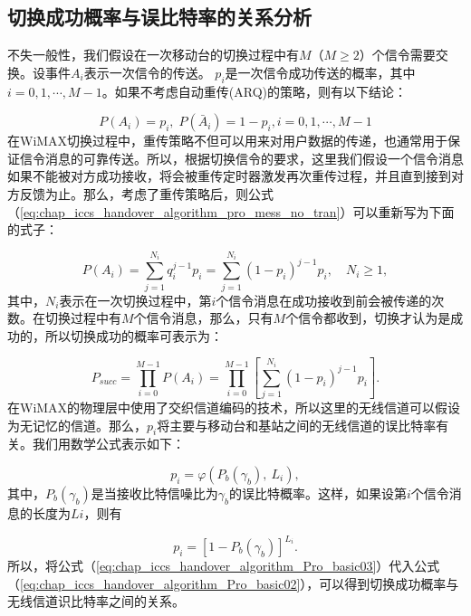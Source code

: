 \subsection{切换成功概率与误比特率的关系分析}
不失一般性，我们假设在一次移动台的切换过程中有$M$（$M \ge 2 $）个信令需要交换。设事件$A_i$表示一次信令的传送。 $p_i$是一次信令成功传送的概率，其中 $i = 0,1, \cdots, M-1 $。如果不考虑自动重传(ARQ)的策略，则有以下结论：

\begin{equation}
\label{eq:chap_iccs_handover_algorithm_pro_mess_no_tran}
P(A_{i})=p_{i},\; P(\bar{A}_{i})=1- p_{i}, i=0,1,\cdots,M-1
\end{equation}
在WiMAX切换过程中，重传策略不但可以用来对用户数据的传递，也通常用于保证信令消息的可靠传送。所以，根据切换信令的要求，这里我们假设一个信令消息如果不能被对方成功接收，将会被重传定时器激发再次重传过程，并且直到接到对方反馈为止。那么，考虑了重传策略后，则公式 （\ref{eq:chap_iccs_handover_algorithm_pro_mess_no_tran}）可以重新写为下面的式子：

\begin{equation}
\label{eq:chap_iccs_handover_algorithm_Pro_basic01}
P(A_{i})=\sum_{j=1}^{N_{i}}q_{i}^{j-1}p_{i}=\sum_{j=1}^{N_{i}}
(1-p_{i})^{j-1}p_{i},\quad N_{i}\geq1,
\end{equation}
其中，$N_i$表示在一次切换过程中，第$i$个信令消息在成功接收到前会被传递的次数。在切换过程中有$M$个信令消息，那么，只有$M$个信令都收到，切换才认为是成功的，所以切换成功的概率可表示为：

\begin{equation}
\label{eq:chap_iccs_handover_algorithm_Pro_basic02}
P_{succ}=\prod_{i=0}^{M-1}P(A_{i})=\prod_{i=0}^{M-1}
\left[\sum_{j=1}^{N_{i}}(1-p_{i})^{j-1}p_{i}\right].
\end{equation}
在WiMAX的物理层中使用了交织信道编码的技术，所以这里的无线信道可以假设为无记忆的信道。那么，$p_i$将主要与移动台和基站之间的无线信道的误比特率有关。我们用数学公式表示如下：

$$
p_{i}=\varphi(P_{b}(\gamma_{b}),\: L_{i}),
$$
其中，$P_b(\gamma_b)$是当接收比特信噪比为$\gamma_b$的误比特概率。这样，如果设第$i$个信令消息的长度为$Li$，则有

\begin{equation}\label{eq:chap_iccs_handover_algorithm_Pro_basic03}
p_{i}=[1-P_{b}(\gamma_{b})]^{L_{i}}.
\end{equation}
所以，将公式（\ref{eq:chap_iccs_handover_algorithm_Pro_basic03}）代入公式（\ref{eq:chap_iccs_handover_algorithm_Pro_basic02}），可以得到切换成功概率与无线信道识比特率之间的关系。

